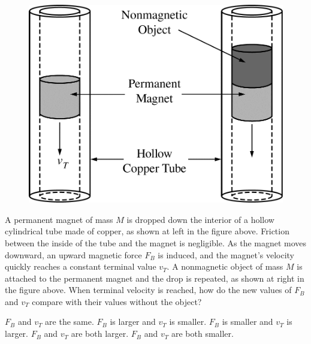 \begin{figure}[H]
\centering
\includegraphics[scale=0.25]{images/img-010-032.png}
\end{figure}

\begin{questions}\setcounter{question}{19}\question
A permanent magnet of mass $M$ is dropped down the interior of a hollow cylindrical tube made of copper, as shown at left in the figure above. Friction between the inside of the tube and the magnet is negligible. As the magnet moves downward, an upward magnetic force $F_{B}$ is induced, and the magnet's velocity quickly reaches a constant terminal value $v_{T}$. A nonmagnetic object of mass $M$ is attached to the permanent magnet and the drop is repeated, as shown at right in the figure above. When terminal velocity is reached, how do the new values of $F_{B}$ and $v_{T}$ compare with their values without the object?

\begin{choices}
\choice $F_{B}$ and $v_{T}$ are the same.
\choice $F_{B}$ is larger and $v_{T}$ is smaller.
\choice $F_{B}$ is smaller and $v_{T}$ is larger.
\choice $F_{B}$ and $v_{T}$ are both larger.
\choice $F_{B}$ and $v_{T}$ are both smaller.
\end{choices}\end{questions}

